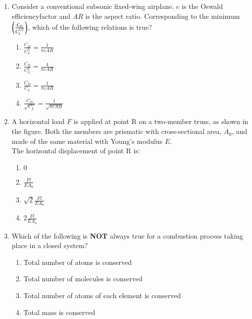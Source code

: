 \documentclass[journal]{IEEEtran}
\begin{document}
\begin{enumerate}
    \item Consider a conventional subsonic fixed-wing airplane. $e$ is the Oswald efficiencyfactor and $AR$ is the aspect ratio. Corresponding to the minimum $\left(\frac{C_D}{C_L^{3/2}}\right)$, which of the following relations is true?
    \begin{enumerate}
        \item $\frac{C_D}{C_L^2} = \frac{1}{\pi e A R}$
        \item $\frac{C_D}{C_L^2} = \frac{4}{\pi e A R}$
        \item $\frac{C_D}{C_L} = \frac{1}{\pi e A R}$
        \item $\frac{C_D}{\sqrt{C_L}} = \frac{1}{\sqrt{\pi e A R}}$
    \end{enumerate}


    \item A horizontal load $F$ is applied at point R on a two-member truss, as shown in the figure. Both the members are prismatic with cross-sectional area, $A_0$, and made of the same material with Young's modulus $E$.\\The horizontal displacement of point R is:
        \begin{figure}[H]
            \centering
            
            \caption{}
            \label{41fig}
        \end{figure}

        \begin{enumerate}
            \item $0$
            \item $\frac{Fl}{E A_0}$
            \item $\sqrt{2}\frac{Fl}{E A_0}$
            \item $2\frac{Fl}{E A_0}$
        \end{enumerate}

    \item Which of the following is \textbf{NOT} always true for a combustion process taking place in a closed system?
        \begin{enumerate}
            \item Total number of atoms is conserved
            \item Total number of molecules is conserved
            \item Total number of atoms of each element is conserved
            \item Total mass is conserved
        \end{enumerate}


\end{enumerate}
\end{document}
